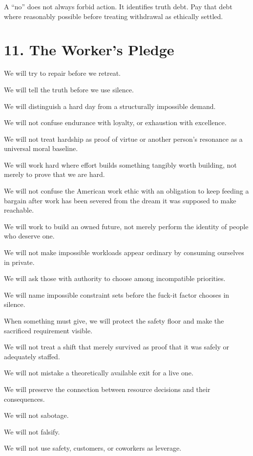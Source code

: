 \documentclass[11pt,oneside]{article}
\begin{document}
A ``no'' does not always forbid action. It identifies truth debt. Pay
that debt where reasonably possible before treating withdrawal as
ethically settled.

\section{11. The Worker's Pledge}\label{the-workers-pledge}

We will try to repair before we retreat.

We will tell the truth before we use silence.

We will distinguish a hard day from a structurally impossible demand.

We will not confuse endurance with loyalty, or exhaustion with
excellence.

We will not treat hardship as proof of virtue or another person's
resonance as a universal moral baseline.

We will work hard where effort builds something tangibly worth building,
not merely to prove that we are hard.

We will not confuse the American work ethic with an obligation to keep
feeding a bargain after work has been severed from the dream it was
supposed to make reachable.

We will work to build an owned future, not merely perform the identity
of people who deserve one.

We will not make impossible workloads appear ordinary by consuming
ourselves in private.

We will ask those with authority to choose among incompatible
priorities.

We will name impossible constraint sets before the fuck-it factor
chooses in silence.

When something must give, we will protect the safety floor and make the
sacrificed requirement visible.

We will not treat a shift that merely survived as proof that it was
safely or adequately staffed.

We will not mistake a theoretically available exit for a live one.

We will preserve the connection between resource decisions and their
consequences.

We will not sabotage.

We will not falsify.

We will not use safety, customers, or coworkers as leverage.
\end{document}

